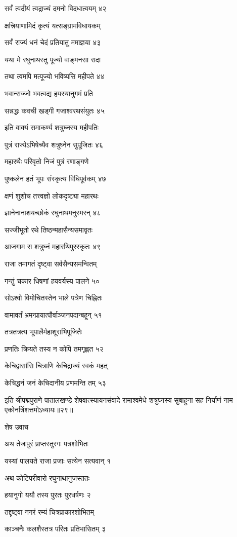 सर्वं त्वदीयं त्वद्राज्यं दमनो विदधात्वयम् ४२

क्षत्त्रियाणामिदं कृत्यं यत्सङ्ग्रामविधायकम्

सर्वं राज्यं धनं चेदं प्रतियातु ममाज्ञया ४३

यथा मे रघुनाथस्तु पूज्यो वाङ्मनसा सदा

तथा त्वमपि मत्पूज्यो भविष्यसि महीपते ४४

भवान्सज्जो भवत्वद्य हयस्यानुगमं प्रति

सन्नद्धः कवची खड्गी गजाश्वरथसंयुतः ४५

इति वाक्यं समाकर्ण्य शत्रुघ्नस्य महीपतिः

पुत्रं राज्येऽभिषेच्यैव शत्रुघ्नेन सुपूजितः ४६

महारथैः परिवृतो निजं पुत्रं रणाङ्गणे

पुष्कलेन हतं भूपः संस्कृत्य विधिपूर्वकम् ४७

क्षणं शुशोच तत्त्वज्ञो लोकदृष्ट्या महारथः

ज्ञानेनानाशयच्छोकं रघुनाथमनुस्मरन् ४८

सज्जीभूतो रथे तिष्ठन्महासैन्यसमावृतः

आजगाम स शत्रुघ्नं महारथिपुरस्कृतः ४९

राजा तमागतं दृष्ट्वा सर्वसैन्यसमन्वितम्

गन्तुं चकार धिषणां हयवर्यस्य पालने ५०

सोऽश्वो विमोचितस्तेन भाले पत्रेण चिह्नितः

वामावर्तं भ्रमन्प्रायात्पौर्वाञ्जनपदान्बहून् ५१

तत्रतत्रत्य भूपालैर्महाशूराभिपूजितैः

प्रणतिः क्रियते तस्य न कोपि तमगृह्णत ५२

केचिद्वासांसि चित्राणि केचिद्राज्यं स्वकं महत्

केचिद्धनं जनं केचिदानीय प्रणमन्ति तम् ५३

इति श्रीपद्मपुराणे पातालखण्डे शेषवात्स्यायनसंवादे रामाश्वमेधे शत्रुघ्नस्य सुबाहुना सह निर्याणं नाम एकोनत्रिंशत्तमोऽध्यायः॥२९॥


शेष उवाच

अथ तेजःपुरं प्राप्तस्तुरगः पत्रशोभितः

यस्यां पालयते राजा प्रजाः सत्येन सत्यवान् १

अथ कोटिपरीवारो रघुनाथानुजस्ततः

हयानुगो ययौ तस्य पुरतः पुरधर्षणः २

तद्दृष्ट्वा नगरं रम्यं चित्रप्राकारशोभितम्

काञ्चनैः कलशैस्तत्र परितः प्रतिभासितम् ३

